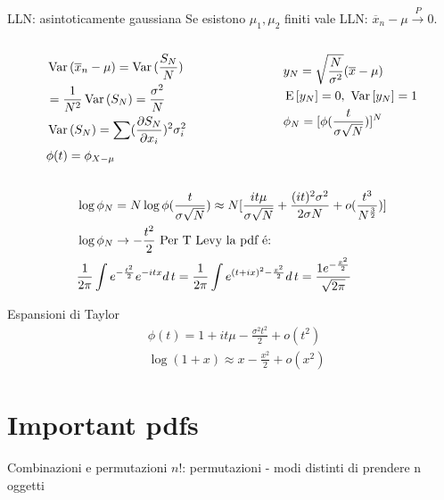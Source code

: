 \begin{frame}{LLN: asintoticamente gaussiana}
Se esistono $\mu_1, \mu_2$ finiti vale LLN: $\overline{x}_n-\mu\xrightarrow{P}0$.
\begin{columns}[T]
\begin{column}{0.5\textwidth}
\begin{align*}
&\var{(\overline{x}_n-\mu)}=\var{(\frac{S_N}{N})}\\
&=\frac{1}{N^2}\var{(S_N)}=\frac{\sigma^2}{N}\\
&\var{(S_N)}=\sum(\PDy{x_i}{S_N})^2\sigma_i^2\\
&\phi(t)=\phi_{X-\mu}
\end{align*}
\end{column}
\begin{column}{0.5\textwidth}
\begin{align*}
&y_N=\sqrt{\frac{N}{\sigma^2}}(\overline{x}-\mu)\\
&\E{[y_N]}=0,\ \var{[y_N]}=1\\
&\phi_N=[\phi(\frac{t}{\sigma\sqrt{N}})]^N
\end{align*}
\end{column}
\end{columns}
\begin{align*}
&\log{\phi_N}=N\log{\phi(\frac{t}{\sigma\sqrt{N}})}\approx N[\frac{it\mu}{\sigma\sqrt{N}}+\frac{(it)^2\sigma^2}{2\sigma N}+o(\frac{t^3}{N\expy{\frac{3}{2}}})]\\
&\log{\phi_N}\to-\frac{t^2}{2}\ \text{Per T Levy la pdf \'e:}\\
&\frac{1}{2\pi}\int\exp{-\frac{t^2}{2}}\exp{-itx}d\,t=\frac{1}{2\pi}\int\exp{(t+ix)^2-\frac{x^2}{2}}d\,t=\frac{1\exp{-\frac{x^2}{2}}}{\sqrt{2\pi}}
\end{align*}
\end{frame}

\begin{wordonframe}{Espansioni di Taylor}
\begin{align*}
&\phi(t)=1+it\mu-\frac{\sigma^2t^2}{2}+o(t^2)\\
&\log{(1+x)}\approx x-\frac{x^2}{2}+o(x^2)
\end{align*}
\end{wordonframe}

\section{Important pdfs}

\begin{frame}{Combinazioni e permutazioni}
$n!$: permutazioni - modi distinti di prendere n oggetti
\end{frame}

